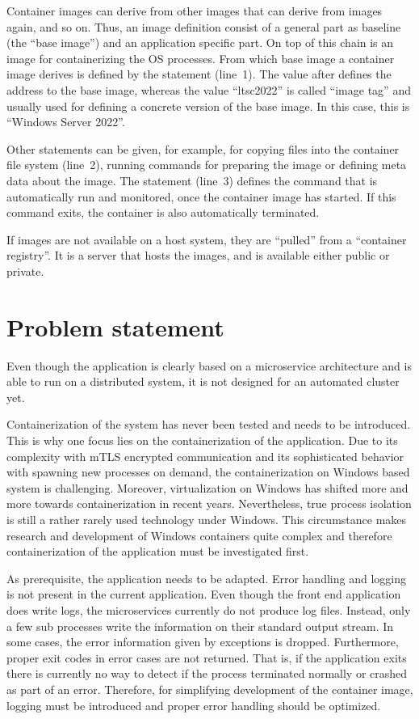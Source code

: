 Container images can derive from other images that can derive from images again, and so on. Thus, an image definition consist of a general part as baseline (the \enquote{base image}) and an application specific part. On top of this chain is an image for containerizing the \ac{OS} processes. From which base image a container image derives is defined by the  statement (line~1).
The value after  defines the address to the base image, whereas the value \enquote{ltsc2022} is called \enquote{image tag} and usually used for defining a concrete version of the base image. In this case, this is \enquote{\ac{Windows} Server 2022}.

Other statements can be given, for example, for copying files into the container file system (line~2), running commands for preparing the image or defining meta data about the image. The statement  (line~3) defines the command that is automatically run and monitored, once the container image has started. If this command exits, the container is also automatically terminated.

If images are not available on a host system, they are \enquote{pulled} from a \enquote{container registry}. It is a server that hosts the images, and is available either public or private.


\section{Problem statement}
Even though the application is clearly based on a microservice architecture and is able to run on a distributed system, it is not designed for an automated cluster yet. 

Containerization of the system has never been tested and needs to be introduced. 
This is why one focus lies on the containerization of the application. Due to its complexity with \ac{mTLS} encrypted communication and its sophisticated behavior with spawning new processes on demand, the containerization on \ac{Windows} based system is challenging.
Moreover, virtualization on \ac{Windows} has shifted more and more towards containerization in recent years. Nevertheless, true process isolation is still a rather rarely used technology under Windows. This circumstance makes research and development of \ac{Windows} containers quite complex and therefore containerization of the application must be investigated first.

As prerequisite, the application needs to be adapted. Error handling and logging is not present in the current application. 
Even though the front end application does write logs, the microservices currently do not produce log files. Instead, only a few sub processes write the information on their standard output stream. In some cases, the error information given by exceptions is dropped.
Furthermore, proper exit codes in error cases are not returned. That is, if the application exits there is currently no way to detect if the process terminated normally or crashed as part of an error.
Therefore, for simplifying development of the container image, logging must be introduced and proper error handling should be optimized.

